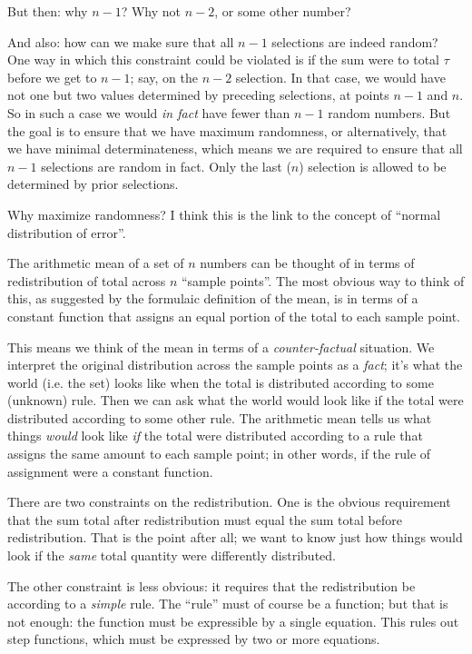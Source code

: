 \begin{ednote}
  But then: why \(n-1\)?  Why not \(n-2\), or some other number?

  And also: how can we make sure that all \(n-1\) selections are
  indeed random?  One way in which this constraint could be violated
  is if the sum were to total \(\tau\) before we get to \(n-1\); say, on
  the \(n-2\) selection.  In that case, we would have not one but two
  values determined by preceding selections, at points \(n-1\) and
  \(n\).  So in such a case we would \emph{in fact} have fewer than
  \(n-1\) random numbers.  But the goal is to ensure that we have
  maximum randomness, or alternatively, that we have minimal
  determinateness, which means we are required to ensure that all
  \(n-1\) selections are random in fact.  Only the last (\(n\))
  selection is allowed to be determined by prior selections.
\end{ednote}

\begin{ednote}
    Why maximize randomness?  I think this is the link to the concept of
  ``normal distribution of error''.
\end{ednote}

The arithmetic mean of a set of \(n\) numbers can be thought of in
terms of redistribution of total across \(n\) ``sample points''.  The
most obvious way to think of this, as suggested by the formulaic
definition of the mean, is in terms of a constant function that
assigns an equal portion of the total to each sample point.

This means we think of the mean in terms of a \emph{counter-factual}
situation.  We interpret the original distribution across the sample
points as a \emph{fact}; it's what the world (i.e. the set) looks like
when the total is distributed according to some (unknown) rule.  Then
we can ask what the world would look like if the total were
distributed according to some other rule.  The arithmetic mean tells
us what things \emph{would} look like \emph{if} the total were
distributed according to a rule that assigns the same amount to each
sample point; in other words, if the rule of assignment were a
constant function.

There are two constraints on the redistribution.  One is the obvious
requirement that the sum total after redistribution must equal the sum
total before redistribution.  That is the point after all; we want to
know just how things would look if the \emph{same} total quantity were
differently distributed.

The other constraint is less obvious: it requires that the
redistribution be according to a \emph{simple} rule.  The ``rule''
must of course be a function; but that is not enough: the function
must be expressible by a single equation.  This rules out step
functions, which must be expressed by two or more equations.

